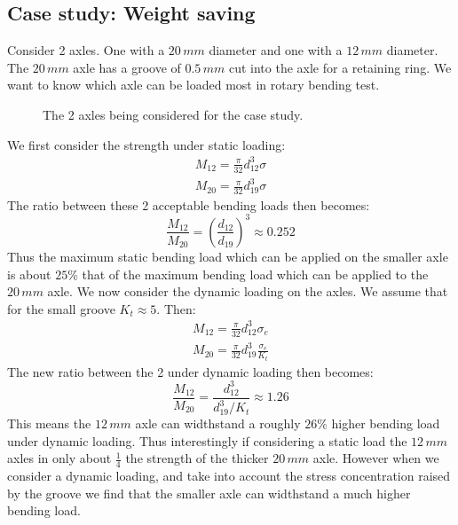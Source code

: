 \documentclass[11pt, a4paper]{article}
\begin{document}
\subsection{Case study: Weight saving}
Consider 2 axles. One with a $20\,mm$ diameter and one with a $12\,mm$ diameter. The $20\,mm$ axle has a groove of $0.5\,mm$ cut into the axle for a retaining ring. We want to know which axle can be loaded most in rotary bending test.
\begin{figure}[h]
  \centering
  \qquad \qquad
  \caption{The 2 axles being considered for the case study.}
\end{figure} 
We first consider the strength under static loading:
\begin{gather*}
  M_{12} = \frac{\pi}{32}d_{12}^3\sigma\\
  M_{20} = \frac{\pi}{32}d_{19}^3\sigma
\end{gather*}
The ratio between these 2 acceptable bending loads then becomes:
\begin{equation*}
  \frac{M_{12}}{M_{20}} = \left(\frac{d_{12}}{d_{19}}\right)^3 \approx 0.252
\end{equation*}
Thus the maximum static bending load which can be applied on the smaller axle is about $25\%$ that of the maximum bending load which can be applied to the $20\,mm$ axle. We now consider the dynamic loading on the axles. We assume that for the small groove $K_t \approx 5$. Then:
\begin{gather*}
  M_{12} = \frac{\pi}{32} d_{12}^3 \sigma_e\\
  M_{20} = \frac{\pi}{32} d_{19}^3 \frac{\sigma_e}{K_t}
\end{gather*}
The new ratio between the 2 under dynamic loading then becomes:
\begin{equation*}
  \frac{M_{12}}{M_{20}} = \frac{d_{12}^3}{d_{19}^3 / K_t} \approx 1.26
\end{equation*}
This means the $12\,mm$ axle can widthstand a roughly $26\%$ higher bending load under dynamic loading. Thus interestingly if considering a static load the $12\,mm$ axles in only about $\frac{1}{4}$ the strength of the thicker $20\,mm$ axle. However when we consider a dynamic loading, and take into account the stress concentration raised by the groove we find that the smaller axle can widthstand a much higher bending load.
\end{document}
